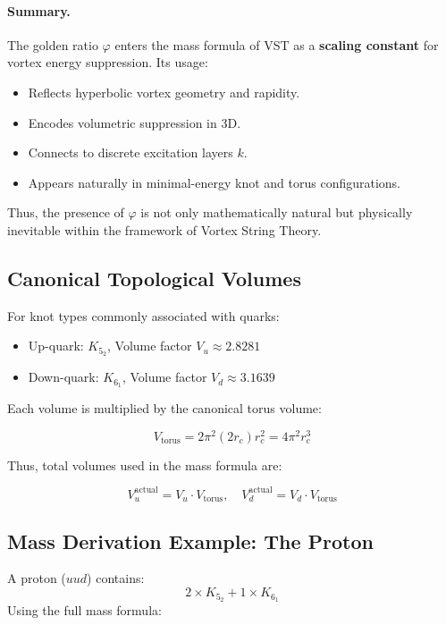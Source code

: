 \documentclass[11pt]{article}
\begin{document}
    \paragraph{Summary.}
    The golden ratio \( \varphi \) enters the mass formula of VST as a \textbf{scaling constant} for vortex energy suppression. Its usage:
    \begin{itemize}
        \item Reflects hyperbolic vortex geometry and rapidity.
        \item Encodes volumetric suppression in 3D.
        \item Connects to discrete excitation layers \( k \).
        \item Appears naturally in minimal-energy knot and torus configurations.
    \end{itemize}
    Thus, the presence of \( \varphi \) is not only mathematically natural but physically inevitable within the framework of Vortex String Theory.

    \subsection{Canonical Topological Volumes}

    For knot types commonly associated with quarks:

    \begin{itemize}
        \item Up-quark: \( K_{5_2} \), Volume factor \( V_u \approx 2.8281 \)
        \item Down-quark: \( K_{6_1} \), Volume factor \( V_d \approx 3.1639 \)
    \end{itemize}

    Each volume is multiplied by the canonical torus volume:

    \[
        V_{\text{torus}} = 2 \pi^2 (2r_c) r_c^2 = 4 \pi^2 r_c^3
    \]

    Thus, total volumes used in the mass formula are:

    \[
        V_u^{\text{actual}} = V_u \cdot V_{\text{torus}}, \quad
        V_d^{\text{actual}} = V_d \cdot V_{\text{torus}}
    \]

    \subsection{Mass Derivation Example: The Proton}

    A proton (\( uud \)) contains:
    \[
        2 \times K_{5_2} + 1 \times K_{6_1}
    \]
    Using the full mass formula:
\end{document}
